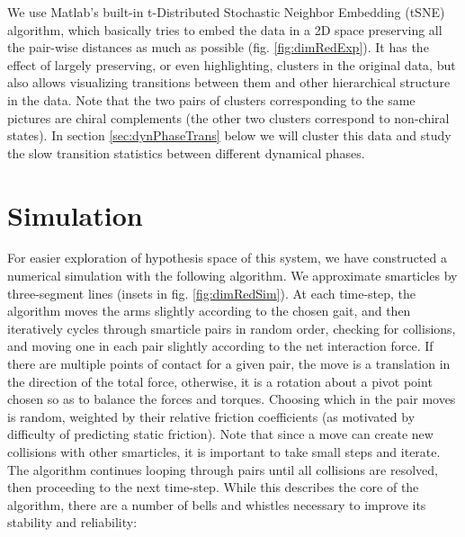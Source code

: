 \documentclass[reprint,prx]{revtex4-1}
\renewcommand{\=}[1]{\stackrel{#1}{=}} %
\renewcommand{\(}{\left (}
\renewcommand{\)}{\right  )}
\renewcommand{\[}{\left [}
\renewcommand{\]}{\right ]}
\newcommand{\<}{\left <}
\renewcommand{\>}{\right >}
\theoremstyle{definition}
\theoremstyle{remark}
\begin{document}
We use Matlab's built-in t-Distributed Stochastic Neighbor Embedding (tSNE) algorithm, which basically tries to embed the data in a 2D space preserving all the pair-wise distances as much as possible (fig. \ref{fig:dimRedExp}). It has the effect of largely preserving, or even highlighting, clusters in the original data, but also allows visualizing transitions between them and other hierarchical structure in the data. Note that the two pairs of clusters corresponding to the same pictures are chiral complements (the other two clusters correspond to non-chiral states). In section \ref{sec:dynPhaseTrans} below we will cluster this data and study the slow transition statistics between different dynamical phases.

\section{Simulation}
For easier exploration of hypothesis space of this system, we have constructed a numerical simulation with the following algorithm. We approximate smarticles by three-segment lines (insets in fig. \ref{fig:dimRedSim}). At each time-step, the algorithm moves the arms slightly according to the chosen gait, and then iteratively cycles through smarticle pairs in random order, checking for collisions, and moving one in each pair slightly according to the net interaction force. If there are multiple points of contact for a given pair, the move is a translation in the direction of the total force, otherwise, it is a rotation about a pivot point chosen so as to balance the forces and torques. Choosing which in the pair moves is random, weighted by their relative friction coefficients (as motivated by difficulty of predicting static friction). Note that since a move can create new collisions with other smarticles, it is important to take small steps and iterate. The algorithm continues looping through pairs until all collisions are resolved, then proceeding to the next time-step. While this describes the core of the algorithm, there are a number of bells and whistles necessary to improve its stability and reliability:
\end{document}
